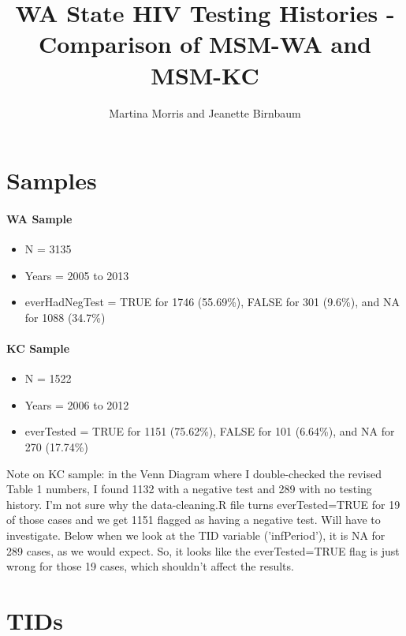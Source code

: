 \documentclass{article}\usepackage[]{graphicx}\usepackage[]{color}
\begin{document}
\title{WA State HIV Testing Histories - Comparison of MSM-WA and MSM-KC}
\author{Martina Morris and Jeanette Birnbaum}
\maketitle

\section{Samples}




\paragraph{WA Sample}
\begin{itemize}
    \item N = 3135
    \item Years = 2005 to 2013
    \item everHadNegTest = TRUE for 1746 (55.69\%), FALSE for 301 (9.6\%), and NA for 1088 (34.7\%)
\end{itemize}

\paragraph{KC Sample}
\begin{itemize}
    \item N = 1522
    \item Years = 2006 to 2012
    \item everTested = TRUE for 1151 (75.62\%), FALSE for 101 (6.64\%), and NA for 270 (17.74\%)
\end{itemize}

Note on KC sample: in the Venn Diagram where I double-checked the revised Table 1 numbers, I found 1132 with a negative test and 289 with no testing history. I'm not sure why the data-cleaning.R file turns everTested=TRUE for 19 of those cases and we get 1151 flagged as having a negative test. Will have to investigate. Below when we look at the TID variable ('infPeriod'), it is NA for 289 cases, as we would expect. So, it looks like the everTested=TRUE flag is just wrong for those 19 cases, which shouldn't affect the results.

\section{TIDs}
\end{document}

